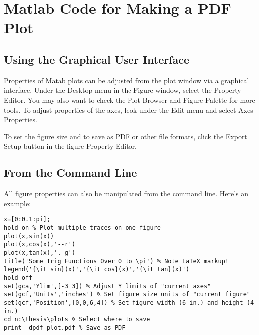 \chapter[PDF Plots From Matlab]{Matlab Code for Making a PDF Plot}
\label{AppendixA}
\section{Using the Graphical User Interface}
Properties of Matab plots can be adjusted from the plot window via a graphical interface. Under the Desktop menu in the Figure window, select the Property Editor. You may also want to check the Plot Browser and Figure Palette for more tools. To adjust properties of the axes, look under the Edit menu and select Axes Properties.

To set the figure size and to save as PDF or other file formats, click the Export Setup button in the figure Property Editor.

\section{From the Command Line} 
All figure properties can also be manipulated from the command line. Here's an example: 
\begin{verbatim}
x=[0:0.1:pi];
hold on % Plot multiple traces on one figure
plot(x,sin(x))
plot(x,cos(x),'--r')
plot(x,tan(x),'.-g')
title('Some Trig Functions Over 0 to \pi') % Note LaTeX markup!
legend('{\it sin}(x)','{\it cos}(x)','{\it tan}(x)')
hold off
set(gca,'Ylim',[-3 3]) % Adjust Y limits of "current axes"
set(gcf,'Units','inches') % Set figure size units of "current figure"
set(gcf,'Position',[0,0,6,4]) % Set figure width (6 in.) and height (4 in.)
cd n:\thesis\plots % Select where to save
print -dpdf plot.pdf % Save as PDF
\end{verbatim}